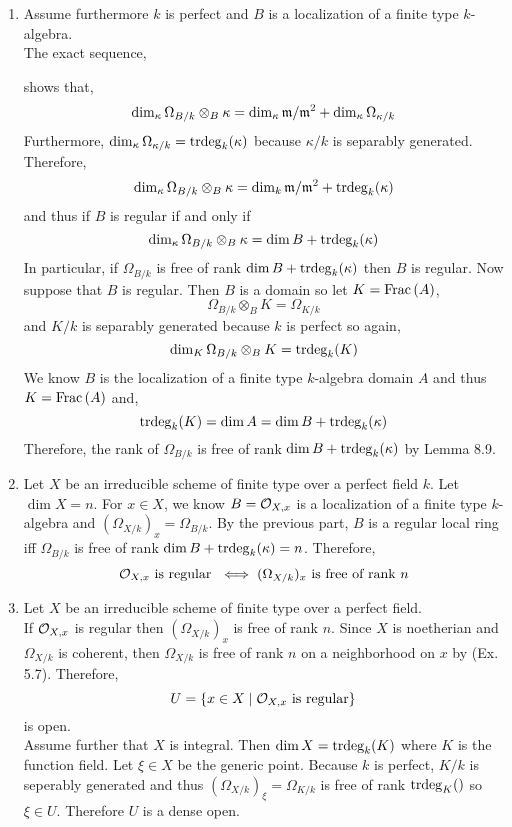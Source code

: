 \documentclass[12pt]{article}
\begin{document}
\begin{enumerate}
\item Assume furthermore $k$ is perfect and $B$ is a localization of a finite type $k$-algebra. 
\bigskip\\
The exact sequence,
\begin{center}
\end{center}
shows that,
\[ \dim_\kappa \Omega_{B/k} \otimes_B \kappa = \dim_\kappa \mathfrak{m}/\mathfrak{m}^2 + \dim_\kappa \Omega_{\kappa/k} \]
Furthermore, $\dim_\kappa \Omega_{\kappa / k} = \mathrm{trdeg}_{k}(\kappa)$ because $\kappa / k$ is separably generated. Therefore,
\[ \dim_\kappa \Omega_{B/k} \otimes_B \kappa = \dim_k \mathfrak{m}/\mathfrak{m}^2 + \mathrm{trdeg}_{k}(\kappa) \]
and thus if $B$ is regular if and only if
\[ \dim_\kappa \Omega_{B/k} \otimes_B \kappa = \dim{B} + \mathrm{trdeg}_{k}(\kappa) \]
In particular, if $\Omega_{B/k}$ is free of rank $\dim{B} + \mathrm{trdeg}_{k}(\kappa)$ then $B$ is regular. 
\bigskip
Now suppose that $B$ is regular. Then $B$ is a domain so let $K = \mathrm{Frac}\left(A\right)$,
\[ \Omega_{B/k} \otimes_B K = \Omega_{K/k} \]
and $K / k$ is separably generated because $k$ is perfect so again,
\[ \dim_{K} \Omega_{B/k} \otimes_B K = \mathrm{trdeg}_{k}(K) \]
We know $B$ is the localization of a finite type $k$-algebra domain $A$ and thus $K = \mathrm{Frac}\left(A\right)$ and,
\[ \mathrm{trdeg}_{k}(K) = \dim{A} = \dim{B} + \mathrm{trdeg}_{k}(\kappa) \]
Therefore, the rank of $\Omega_{B/k}$ is free of rank $\dim{B} + \mathrm{trdeg}_{k}(\kappa)$ by Lemma 8.9.

\item Let $X$ be an irreducible scheme of finite type over a perfect field $k$. Let $\dim{X} = n$. For $x \in X$, we know $B = \mathcal{O}_{X, x}$ is a localization of a finite type $k$-algebra and $(\Omega_{X/k})_x = \Omega_{B/k}$. By the previous part, $B$ is a regular local ring iff $\Omega_{B/k}$ is free of rank $\dim{B} + \mathrm{trdeg}_{k}(\kappa) = n$. Therefore, 
\[ \mathcal{O}_{X, x} \text{ is regular } \iff (\Omega_{X/k})_x \text{ is free of rank } n \]

\item Let $X$ be an irreducible scheme of finite type over a perfect field.
\bigskip\\
If $\mathcal{O}_{X, x}$ is regular then $(\Omega_{X/k})_x$ is free of rank $n$. Since $X$ is noetherian and $\Omega_{X/k}$ is coherent, then $\Omega_{X/k}$ is free of rank $n$ on a neighborhood on $x$ by (Ex. 5.7). Therefore,
\[ U = \{x \in X \mid \mathcal{O}_{X, x} \text{ is regular} \} \]
is open. 
\bigskip\\
Assume further that $X$ is integral. Then $\dim{X} = \mathrm{trdeg}_{k}(K)$ where $K$ is the function field. Let $\xi \in X$ be the generic point. Because $k$ is perfect, $K / k$ is seperably generated and thus $(\Omega_{X/k})_\xi = \Omega_{K/k}$ is free of rank $\trdeg{K}$ so $\xi \in U$. Therefore $U$ is a dense open.
\end{enumerate}
\end{document}
